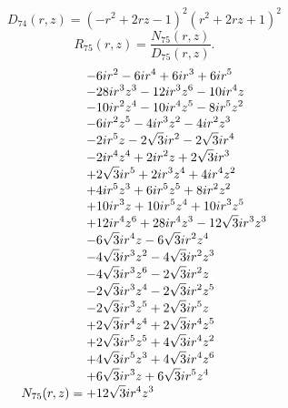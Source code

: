 \documentclass[11pt,a4paper]{article}
\begin{document}
\begin{equation}
D_{74}(r,z)=\left(- r^{2} + 2 r z - 1\right)^{2} \left(r^{2} + 2 r z + 1\right)^{2}
\label{eq:cat-denominator-74}
\end{equation}
\begin{equation}
R_{75}(r,z)=\frac{N_{75}(r,z)}{D_{75}(r,z)}.
\label{eq:cat-rational-75}
\end{equation}
\begin{equation}
N_{75}(r,z)=\shortstack[l]{$\displaystyle  - 6 i r^{2} - 6 i r^{4} + 6 i r^{3} + 6 i r^{5}$\\
$\displaystyle  - 28 i r^{3} z^{3} - 12 i r^{3} z^{6} - 10 i r^{4} z$\\
$\displaystyle  - 10 i r^{2} z^{4} - 10 i r^{4} z^{5} - 8 i r^{5} z^{2}$\\
$\displaystyle  - 6 i r^{2} z^{5} - 4 i r^{3} z^{2} - 4 i r^{2} z^{3}$\\
$\displaystyle  - 2 i r^{5} z - 2 \sqrt{3} i r^{2} - 2 \sqrt{3} i r^{4}$\\
$\displaystyle  - 2 i r^{4} z^{4} + 2 i r^{2} z + 2 \sqrt{3} i r^{3}$\\
$\displaystyle  + 2 \sqrt{3} i r^{5} + 2 i r^{3} z^{4} + 4 i r^{4} z^{2}$\\
$\displaystyle  + 4 i r^{5} z^{3} + 6 i r^{5} z^{5} + 8 i r^{2} z^{2}$\\
$\displaystyle  + 10 i r^{3} z + 10 i r^{5} z^{4} + 10 i r^{3} z^{5}$\\
$\displaystyle  + 12 i r^{4} z^{6} + 28 i r^{4} z^{3} - 12 \sqrt{3} i r^{3} z^{3}$\\
$\displaystyle  - 6 \sqrt{3} i r^{4} z - 6 \sqrt{3} i r^{2} z^{4}$\\
$\displaystyle  - 4 \sqrt{3} i r^{3} z^{2} - 4 \sqrt{3} i r^{2} z^{3}$\\
$\displaystyle  - 4 \sqrt{3} i r^{3} z^{6} - 2 \sqrt{3} i r^{2} z$\\
$\displaystyle  - 2 \sqrt{3} i r^{3} z^{4} - 2 \sqrt{3} i r^{2} z^{5}$\\
$\displaystyle  - 2 \sqrt{3} i r^{3} z^{5} + 2 \sqrt{3} i r^{5} z$\\
$\displaystyle  + 2 \sqrt{3} i r^{4} z^{4} + 2 \sqrt{3} i r^{4} z^{5}$\\
$\displaystyle  + 2 \sqrt{3} i r^{5} z^{5} + 4 \sqrt{3} i r^{4} z^{2}$\\
$\displaystyle  + 4 \sqrt{3} i r^{5} z^{3} + 4 \sqrt{3} i r^{4} z^{6}$\\
$\displaystyle  + 6 \sqrt{3} i r^{3} z + 6 \sqrt{3} i r^{5} z^{4}$\\
$\displaystyle  + 12 \sqrt{3} i r^{4} z^{3}$}
\label{eq:cat-numerator-75}
\end{equation}
\end{document}
